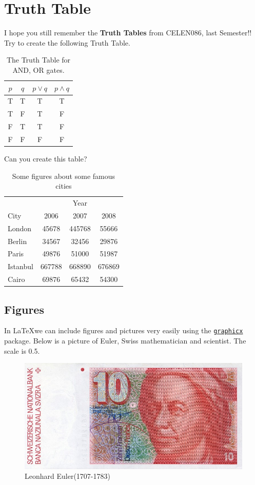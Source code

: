 \documentclass[a4paper,11pt]{article}
\begin{document}
\section{Truth Table}
I hope you still remember the \textbf{Truth Tables} from CELEN086, last Semester!! Try to create the following Truth Table.

\begin{table}[h]
\centering
\begin{tabular}{c|c|c|c}

$p$&$q$&$p \vee q$&$p \wedge q$ \\

\hline
\hline
T&T&T&T\\
T&F&T&F\\
F&T&T&F\\
F&F&F&F\\
\end{tabular}
\caption{The Truth Table for AND, OR gates.}
\end{table}

Can you create this table?
\begin{table}[h]
\centering
\begin{tabular}{l|ccc}
  &  &Year&  \\
\cline{2-4}
City&2006&2007&2008\\
\hline
London&45678&445768&55666\\
Berlin&34567&32456&29876\\
Paris &49876 &51000 &51987\\
Istanbul &667788 &668890 &676869\\
Cairo &69876& 65432& 54300\\
\hline
\end{tabular}
\caption{Some figures about some famous cities}
\end{table}

\subsection{Figures}
In \LaTeX we can include figures and pictures very easily using the \underline{\texttt{graphicx}} package. Below is a picture of Euler, Swiss mathematician and scientist. The scale is 0.5.
\begin{figure}[h]
\centering
\includegraphics[scale=0.5]{Euler}
\caption{Leonhard Euler(1707-1783)}
\end{figure}
\newpage
\end{document}
